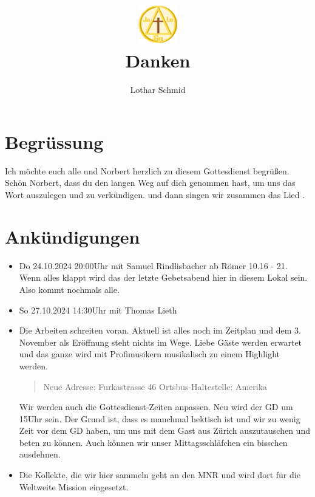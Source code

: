 \documentclass{../inc/mybib}
\title{\includegraphics[height=48pt]{assets/images/logo.png}\\Danken}
\author{Lothar Schmid}
\begin{document}
\maketitle
\section{Begrüssung}

Ich möchte euch alle und Norbert herzlich zu diesem Gottesdienst begrüßen.
Schön Norbert, dass du den langen Weg auf dich genommen hast, um uns das Wort auszulegen und zu verkündigen. 
\beten{} und dann singen wir zusammen das Lied .

\section{Ankündigungen}
\begin{itemize}
    \item {} Do 24.10.2024 20:00Uhr mit Samuel Rindlisbacher ab Römer 10.16 - 21. Wenn alles klappt wird das der letzte Gebetsabend hier in diesem Lokal sein. Also kommt nochmals alle.
    \item {} So 27.10.2024 14:30Uhr mit Thomas Lieth
    \item {} Die Arbeiten schreiten voran. Aktuell ist alles noch im Zeitplan und dem 3. November als Eröffnung steht nichts im Wege. Liebe Gäste werden erwartet und das ganze wird mit Profimusikern musikalisch zu einem Highlight werden.
    \begin{quote}
        Neue Adresse:
        Furkastrasse 46
        Ortsbus-Haltestelle: Amerika
    \end{quote}
    Wir werden auch die Gottesdienst-Zeiten anpassen. Neu wird der GD um 15Uhr sein. Der Grund ist, dass es manchmal hektisch ist und wir zu wenig Zeit vor dem GD haben, um uns mit dem Gast aus Zürich auszutauschen und beten zu können. Auch können wir unser Mittagsschläfchen ein bisschen ausdehnen.
    \item Die Kollekte, die wir hier sammeln geht an den MNR und wird dort für die Weltweite Mission eingesetzt.    
\end{itemize}
\end{document}
